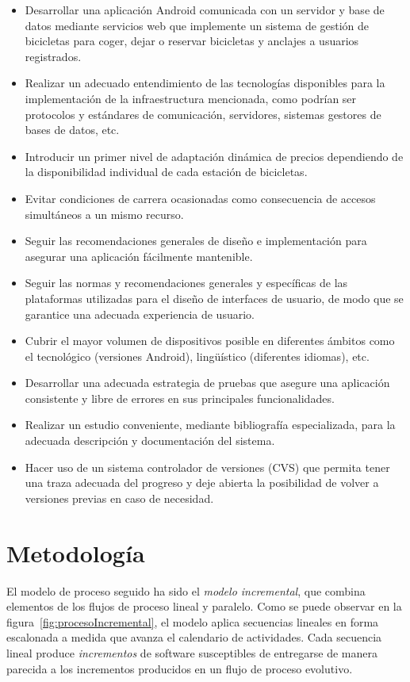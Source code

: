 \begin{itemize}  
	\item Desarrollar una aplicación Android comunicada con un servidor y base de datos mediante servicios web que implemente un sistema de gestión de bicicletas para coger, dejar o reservar bicicletas y anclajes a usuarios registrados.
	\item Realizar un adecuado entendimiento de las tecnologías disponibles para la implementación de la infraestructura mencionada, como podrían ser protocolos y estándares de comunicación, servidores, sistemas gestores de bases de datos, etc.
	\item Introducir un primer nivel de adaptación dinámica de precios dependiendo de la disponibilidad individual de cada estación de bicicletas.
	\item Evitar condiciones de carrera ocasionadas como consecuencia de accesos simultáneos a un mismo recurso.
	\item Seguir las recomendaciones generales de diseño e implementación para asegurar una aplicación fácilmente mantenible.
	\item Seguir las normas y recomendaciones generales y específicas de las plataformas utilizadas para el diseño de interfaces de usuario, de modo que se garantice una adecuada experiencia de usuario.
	\item Cubrir el mayor volumen de dispositivos posible en diferentes ámbitos como el tecnológico (versiones Android), lingüístico (diferentes idiomas), etc.
	\item Desarrollar una adecuada estrategia de pruebas que asegure una aplicación consistente y libre de errores en sus principales funcionalidades.
	\item Realizar un estudio conveniente, mediante bibliografía especializada, para la adecuada descripción y documentación del sistema.
	\item Hacer uso de un sistema controlador de versiones (CVS) que permita tener una traza adecuada del progreso y deje abierta la posibilidad de volver a versiones previas en caso de necesidad.
\end{itemize}


\section{Metodología}

El modelo de proceso seguido ha sido el \emph{modelo incremental}, que combina elementos de los flujos de proceso lineal y paralelo. Como se puede observar en la figura~\ref{fig:procesoIncremental}, el modelo aplica secuencias lineales en forma escalonada a medida que avanza el calendario de actividades. Cada secuencia lineal produce \emph{incrementos} de software susceptibles de entregarse de manera parecida a los incrementos producidos en un flujo de proceso evolutivo.

